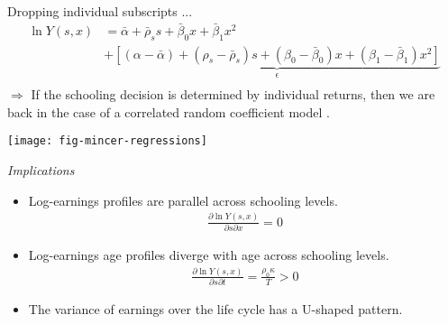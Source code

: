 \begin{frame}
Dropping individual subscripts ...
\begin{align*}
\ln{Y(s, x)} & = \bar{\alpha} + \bar{\rho}_s s + \bar{\beta}_{0} x + \bar{\beta}_{1} x^2 \\
                & + \underbrace{[(\alpha - \bar{\alpha}) + (\rho_s - \bar{\rho}_s) s + (\beta_0 - \bar{\beta}_0)x + (\beta_1 - \bar{\beta}_1)x^2 ]}_{\epsilon}\\
\end{align*}
$\Rightarrow$ If the schooling decision is determined by individual returns, then we are back in the case of a correlated random coefficient model \cite{Heckman.2006d}.
\end{frame}
\begin{frame}[plain]

\begin{center}
\texttt{[image: fig-mincer-regressions]}
\end{center}

\end{frame}
\begin{frame}\begin{center}
\LARGE\textit{Implications}
\end{center}\end{frame}
\begin{frame}
\begin{itemize}
\item Log-earnings profiles are parallel across schooling levels.
\begin{align*}
\frac{\partial \ln{Y(s, x)}}{\partial s \partial x} = 0
\end{align*}
\item Log-earnings age profiles diverge with age across schooling levels.
\begin{align*}
\frac{\partial \ln{Y(s, x)}}{\partial s \partial t} = \frac{\rho_0\kappa}{T} > 0
\end{align*}
\item The variance of earnings over the life cycle has a U-shaped pattern.
\end{itemize}
\end{frame}
